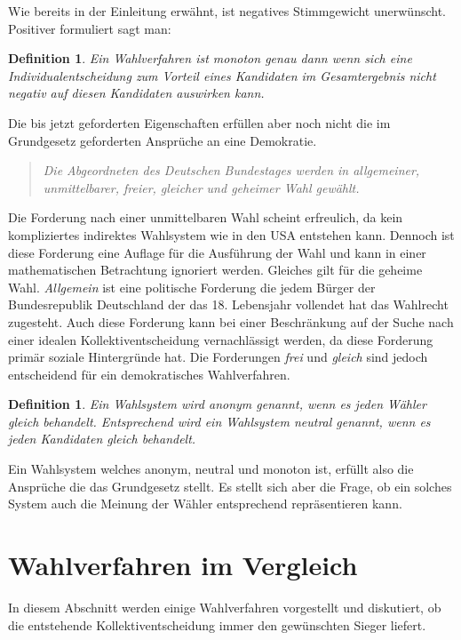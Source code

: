 \documentclass[BCOR5mm,DIV12,a4paper,10pt]{scrartcl}
\newtheorem{definition}[lemma]{Definition} %
\begin{document}
Wie bereits in der Einleitung erwähnt, ist negatives Stimmgewicht unerwünscht. Positiver formuliert sagt man:

\begin{definition}
Ein Wahlverfahren ist \emph{monoton} genau dann wenn sich eine Individualentscheidung zum Vorteil eines Kandidaten im Gesamtergebnis nicht negativ auf diesen Kandidaten auswirken kann.
\end{definition}

Die bis jetzt geforderten Eigenschaften erfüllen aber noch nicht die im Grundgesetz geforderten Ansprüche an eine Demokratie. 

\begin{quote}
\textit{Die Abgeordneten des Deutschen Bundestages werden in allgemeiner, unmittelbarer, freier, gleicher und geheimer Wahl gewählt.} \cite{ggwahlrecht}
\end{quote}


Die Forderung nach einer unmittelbaren Wahl scheint erfreulich, da kein kompliziertes indirektes Wahlsystem wie in den USA entstehen kann. Dennoch ist diese Forderung eine Auflage für die Ausführung der Wahl und kann in einer mathematischen Betrachtung ignoriert werden. Gleiches gilt für die geheime Wahl. \emph{Allgemein} ist eine politische Forderung die jedem Bürger der Bundesrepublik Deutschland der das 18. Lebensjahr vollendet hat das Wahlrecht zugesteht. \cite{bundestag} Auch diese Forderung kann bei einer Beschränkung auf der Suche nach einer idealen Kollektiventscheidung vernachlässigt werden, da diese Forderung primär soziale Hintergründe hat. Die Forderungen \emph{frei} und \emph{gleich} sind jedoch entscheidend für ein demokratisches Wahlverfahren. 

\begin{definition}
Ein Wahlsystem wird \emph{anonym} genannt, wenn es jeden Wähler gleich behandelt. Entsprechend wird ein Wahlsystem \emph{neutral} genannt, wenn es jeden Kandidaten gleich behandelt.
\end{definition}

Ein Wahlsystem welches anonym, neutral und monoton ist, erfüllt also die Ansprüche die das Grundgesetz stellt. Es stellt sich aber die Frage, ob ein solches System auch die Meinung der Wähler entsprechend repräsentieren kann. 


\section{Wahlverfahren im Vergleich}
In diesem Abschnitt werden einige Wahlverfahren vorgestellt und diskutiert, ob die entstehende Kollektiventscheidung immer den gewünschten Sieger liefert.
\end{document}
